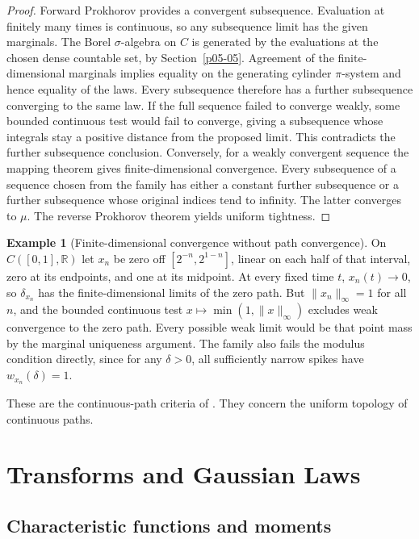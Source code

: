 \documentclass[11pt,oneside,openany]{book}
\newcommand{\R}{\mathbb{R}}
\theoremstyle{plain}
\theoremstyle{definition}
\newtheorem{example}[theorem]{Example}
\theoremstyle{remark}
\begin{document}
\begin{proof}
Forward Prokhorov provides a convergent subsequence. Evaluation
at finitely many times is continuous, so any subsequence limit
has the given marginals. The Borel \(\sigma\)-algebra on \(C\)
is generated by the evaluations at the chosen dense countable
set, by Section~\ref{p05-05}. Agreement of the finite-dimensional
marginals implies equality on the generating cylinder
\(\pi\)-system and hence equality of the laws. Every subsequence
therefore has a further subsequence converging to the same law.
If the full sequence failed to converge weakly, some bounded
continuous test would fail to converge, giving a subsequence
whose integrals stay a positive distance from the proposed limit.
This contradicts the further subsequence conclusion.
Conversely, for a weakly convergent sequence the mapping theorem
gives finite-dimensional convergence. Every subsequence of a
sequence chosen from the family has either a constant further
subsequence or a further subsequence whose original indices tend
to infinity. The latter converges to \(\mu\). The reverse
Prokhorov theorem yields uniform tightness.
\end{proof}

\begin{example}[Finite-dimensional convergence without path convergence]
On \(C([0,1],\R)\) let \(x_n\) be zero off
\([2^{-n},2^{1-n}]\), linear on each half of that interval, zero
at its endpoints, and one at its midpoint. At every fixed time
\(t\), \(x_n(t)\to0\), so \(\delta_{x_n}\) has the
finite-dimensional limits of the zero path. But
\(\lVert x_n\rVert_\infty=1\) for all \(n\), and the bounded
continuous test \(x\mapsto\min(1,\lVert x\rVert_\infty)\)
excludes weak convergence to the zero path. Every possible
weak limit would be that point mass by the marginal uniqueness
argument. The family also fails the modulus condition directly,
since for any \(\delta>0\), all sufficiently narrow spikes
have \(w_{x_n}(\delta)=1\).
\end{example}

These are the continuous-path criteria of
\cite[Theorems 7.1--7.5, pp.~80--85]{Billingsley}.
They concern the uniform topology of continuous paths.
\chapter{Transforms and Gaussian Laws}
\label{chap:transforms}

\section{Characteristic functions and moments}
\label{p07-01}
\end{document}
